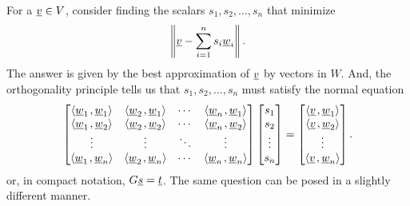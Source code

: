For a $\underline{v} \in V$, consider finding the scalars $s_1,s_2,\ldots,s_n$ that minimize
\begin{equation*}
\left\| \underline{v} - \sum_{i=1}^n s_i \underline{w}_i \right\| .
\end{equation*}
The answer is given by the best approximation of $\underline{v}$ by vectors in $W$.
And, the orthogonality principle tells us that $s_1,s_2,\ldots,s_n$ must satisfy the normal equation
\begin{equation} \label{eqn:DualNormalEquations}
\begin{bmatrix}
{\left\langle  \underline{w}_1  \mskip2mu ,  \underline{w}_1  \right\rangle}
& {\left\langle  \underline{w}_2  \mskip2mu ,  \underline{w}_1  \right\rangle} & \cdots
& {\left\langle  \underline{w}_n  \mskip2mu ,  \underline{w}_1  \right\rangle} \\
{\left\langle  \underline{w}_1  \mskip2mu ,  \underline{w}_2  \right\rangle}
& {\left\langle  \underline{w}_2  \mskip2mu ,  \underline{w}_2  \right\rangle} & \cdots
& {\left\langle  \underline{w}_n  \mskip2mu ,  \underline{w}_2  \right\rangle} \\
\vdots & \vdots & \ddots & \vdots \\
{\left\langle  \underline{w}_1  \mskip2mu ,  \underline{w}_n  \right\rangle}
& {\left\langle  \underline{w}_2  \mskip2mu ,  \underline{w}_n  \right\rangle} & \cdots
& {\left\langle  \underline{w}_n  \mskip2mu ,  \underline{w}_n  \right\rangle}
\end{bmatrix}
\begin{bmatrix} s_1 \\ s_2 \\ \vdots \\ s_n \end{bmatrix}
= \begin{bmatrix}
{\left\langle  \underline{v}  \mskip2mu ,  \underline{w}_1  \right\rangle} \\
{\left\langle  \underline{v}  \mskip2mu ,  \underline{w}_2  \right\rangle} \\ \vdots \\
{\left\langle  \underline{v}  \mskip2mu ,  \underline{w}_n  \right\rangle} \end{bmatrix} .
\end{equation}
or, in compact notation, $G \underline{s} = \underline{t}$.
The same question can be posed in a slightly different manner.

